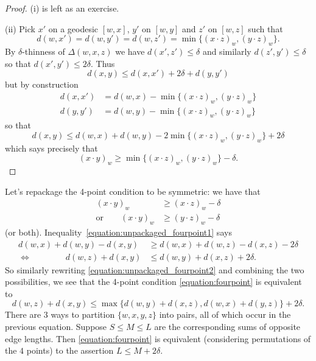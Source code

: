 \begin{proof}
    (i) is left as an exercise. %

    (ii) Pick $x'$ on a geodesic $[w, x]$, $y'$ on $[w, y]$ and $z'$ on $[w, z]$ such that \[
        d(w, x') = d(w, y') = d(w, z') = \min\{ (x \cdot z)_w, (y \cdot z)_w \}.
    \]
    By $\delta$-thinness of $\Delta(w, x, z)$ we have $d(x', z') \leq \delta$ and similarly $d(z', y') \leq \delta$ so that $d(x', y') \leq 2\delta$.
    Thus \[
        d(x, y) \leq d(x, x') + 2\delta + d(y, y')
    \] but by construction
    \begin{align*}
        d(x, x') &= d(w, x) - \min\{ (x \cdot z)_w, (y \cdot z)_w \} \\
        d(y, y') &= d(w, y) - \min\{ (x \cdot z)_w, (y \cdot z)_w \}
    \end{align*}
    so that \[
        d(x, y) \leq d(w, x) + d(w, y) - 2\min\{ (x \cdot z)_w, (y \cdot z)_w \} + 2 \delta
    \] which says precisely that \[
        (x \cdot y)_w \geq \min\{ (x \cdot z)_w, (y \cdot z)_w \} - \delta.
    \]
\end{proof}

Let's repackage the 4-point condition to be symmetric: we have that
\begin{align}
    \label{equation:unpackaged_fourpoint1}
    (x \cdot y)_w
        &\geq (x \cdot z)_w - \delta \\
    \label{equation:unpackaged_fourpoint2}
    \text{or} \qquad (x \cdot y)_w
        &\geq (y \cdot z)_w - \delta
\end{align}
(or both).
Inequality~\eqref{equation:unpackaged_fourpoint1} says
\begin{align*}
    d(w, x) + d(w, y) - d(x, y)
        &\geq d(w, x) + d(w, z) - d(x, z) - 2\delta \\
    \Leftrightarrow \qquad \qquad d(w, z) + d(x, y)
        &\leq d(w, y) + d(x, z) + 2\delta.
\end{align*}
So similarly rewriting \eqref{equation:unpackaged_fourpoint2} and combining the two possibilities, we see that the 4-point condition \eqref{equation:fourpoint} is equivalent to \begin{equation}
    \label{equation:symmetric_fourpoint}
    d(w, z) + d(x, y) \leq \max \{ d(w, y) + d(x, z), d(w, x) + d(y, z) \} + 2\delta. \tag{$\diamond$}
\end{equation}
There are $3$ ways to partition $\{w, x, y, z\}$ into pairs, all of which occur in the previous equation.
Suppose $S \leq M \leq L$ are the corresponding sums of opposite edge lengths.
Then \eqref{equation:fourpoint} is equivalent (considering permutations of the $4$ points) to the assertion $L \leq M + 2\delta$.

